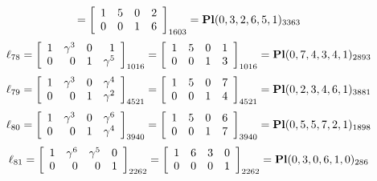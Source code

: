 \documentclass{article}
\begin{document}
{$$=
\left[
\begin{array}{*{4}c}
1  & 5  & 0  & 2\\
0  & 0  & 1  & 6\\
\end{array}
\right]_{1603}
={\rm\bf Pl}(0,3,2,6,5,1 )_{3363}$$
$$
\ell_{78} = 
\left[
\begin{array}{*{4}{r}}
1 & \gamma^{3} & 0 & 1\\
0 & 0 & 1 & \gamma^{5}\\
\end{array}
\right]
_{1016}
=
\left[
\begin{array}{*{4}c}
1  & 5  & 0  & 1\\
0  & 0  & 1  & 3\\
\end{array}
\right]_{1016}
={\rm\bf Pl}(0,7,4,3,4,1 )_{2893}$$
$$
\ell_{79} = 
\left[
\begin{array}{*{4}{r}}
1 & \gamma^{3} & 0 & \gamma^{4}\\
0 & 0 & 1 & \gamma^{2}\\
\end{array}
\right]
_{4521}
=
\left[
\begin{array}{*{4}c}
1  & 5  & 0  & 7\\
0  & 0  & 1  & 4\\
\end{array}
\right]_{4521}
={\rm\bf Pl}(0,2,3,4,6,1 )_{3881}$$
$$
\ell_{80} = 
\left[
\begin{array}{*{4}{r}}
1 & \gamma^{3} & 0 & \gamma^{6}\\
0 & 0 & 1 & \gamma^{4}\\
\end{array}
\right]
_{3940}
=
\left[
\begin{array}{*{4}c}
1  & 5  & 0  & 6\\
0  & 0  & 1  & 7\\
\end{array}
\right]_{3940}
={\rm\bf Pl}(0,5,5,7,2,1 )_{1898}$$
$$
\ell_{81} = 
\left[
\begin{array}{*{4}{r}}
1 & \gamma^{6} & \gamma^{5} & 0\\
0 & 0 & 0 & 1\\
\end{array}
\right]
_{2262}
=
\left[
\begin{array}{*{4}c}
1  & 6  & 3  & 0\\
0  & 0  & 0  & 1\\
\end{array}
\right]_{2262}
={\rm\bf Pl}(0,3,0,6,1,0 )_{286}$$
}
\end{document}
